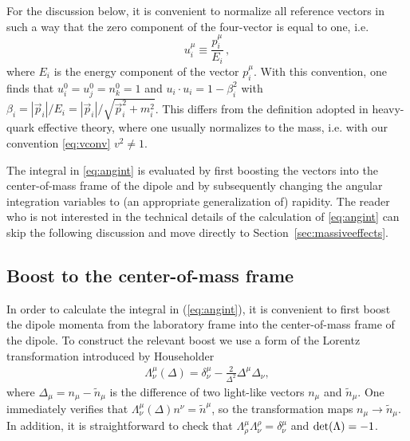 \documentclass[11pt,a4paper]{article}
\begin{document}
For the discussion below, it is convenient to normalize all  reference vectors in such a way that the zero component of the four-vector is equal to one, i.e. 
	\begin{equation}
	u_i^\mu \equiv \frac{p_i^\mu}{E_i} \, , \label{eq:vconv}
	\end{equation}
where $E_i$ is the energy component of the vector $p_i^\mu$. With this convention, one finds that $u_i^0=u_j^0=n_k^0=1$ and $u_i\cdot u_i=1-\beta_i^2$ with $\beta_{i}=|\vec{p}_i|/E_i=|\vec{p}_i|/\sqrt{\vec{p}_i^2+m_i^2}$. This differs from the definition adopted in heavy-quark effective theory, where one usually normalizes to the mass, i.e. with our convention \eqref{eq:vconv} $v^2 \neq 1$.

The integral in \eqref{eq:angint} is evaluated by first boosting the vectors into the center-of-mass frame of the dipole and by subsequently changing the angular integration variables to (an appropriate generalization of) rapidity. The reader who is not interested in the technical details of the calculation of \eqref{eq:angint} can skip the following discussion and move directly to Section~\ref{sec:massiveeffects}.

\subsection{Boost to the center-of-mass frame}

In order to calculate the integral in (\ref{eq:angint}), it is convenient to first boost the dipole momenta from the laboratory frame into the center-of-mass frame of the dipole. To construct the relevant boost we use a form of the  Lorentz transformation introduced by Householder \cite{householder}
\begin{align}\label{eq:auxLorentz}
	\Lambda_\nu^\mu(\Delta)=\delta_\nu^\mu -\frac{2}{\Delta^2}\Delta^\mu\Delta_\nu,
\end{align}
where $\Delta_\mu= n_\mu-\tilde{n}_\mu$ is the difference of two light-like vectors $n_\mu$ and $\tilde{n}_\mu$. One immediately verifies that $\Lambda^{\mu}_{\nu} (\Delta) n^\nu = \tilde{n}^\mu$,
so the transformation maps $n_\mu \to  \tilde{n}_\mu$. In addition, it is straightforward to check  that $\Lambda^\mu_\rho \Lambda^\rho_\nu =  \delta^\mu_\nu$ and ${\rm det}(\Lambda)=-1$.
\end{document}
